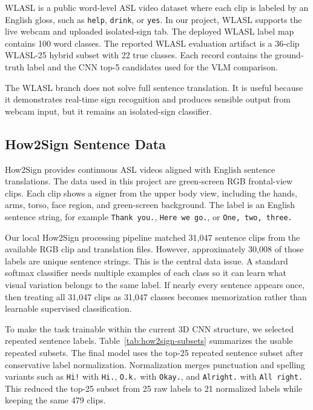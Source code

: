 \documentclass[10pt,twocolumn,letterpaper]{article}
\begin{document}
WLASL is a public word-level ASL video dataset where each clip is labeled by an English gloss, such as \texttt{help}, \texttt{drink}, or \texttt{yes}. In our project, WLASL supports the live webcam and uploaded isolated-sign tab. The deployed WLASL label map contains 100 word classes. The reported WLASL evaluation artifact is a 36-clip WLASL-25 hybrid subset with 22 true classes. Each record contains the ground-truth label and the CNN top-5 candidates used for the VLM comparison.

The WLASL branch does not solve full sentence translation. It is useful because it demonstrates real-time sign recognition and produces sensible output from webcam input, but it remains an isolated-sign classifier.

\subsection{How2Sign Sentence Data}

How2Sign provides continuous ASL videos aligned with English sentence translations. The data used in this project are green-screen RGB frontal-view clips. Each clip shows a signer from the upper body view, including the hands, arms, torso, face region, and green-screen background. The label is an English sentence string, for example \texttt{Thank you.}, \texttt{Here we go.}, or \texttt{One, two, three.}

Our local How2Sign processing pipeline matched 31,047 sentence clips from the available RGB clip and translation files. However, approximately 30,008 of those labels are unique sentence strings. This is the central data issue. A standard softmax classifier needs multiple examples of each class so it can learn what visual variation belongs to the same label. If nearly every sentence appears once, then treating all 31,047 clips as 31,047 classes becomes memorization rather than learnable supervised classification.

To make the task trainable within the current 3D CNN structure, we selected repeated sentence labels. Table~\ref{tab:how2sign-subsets} summarizes the usable repeated subsets. The final model uses the top-25 repeated sentence subset after conservative label normalization. Normalization merges punctuation and spelling variants such as \texttt{Hi!} with \texttt{Hi.}, \texttt{O.k.} with \texttt{Okay.}, and \texttt{Alright.} with \texttt{All right.} This reduced the top-25 subset from 25 raw labels to 21 normalized labels while keeping the same 479 clips.
\end{document}
